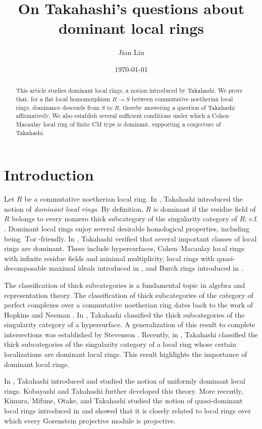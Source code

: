 \documentclass{amsart}
\author[Jian Liu]{Jian Liu}
\title[On Takahashi's questions about dominant local rings]{On Takahashi's questions about dominant local rings}
\date{\today}
\newcommand{\0}{{\bf{0}}}
\DeclareMathOperator{\Tor}{Tor}
\theoremstyle{definition}
\begin{document}
\begin{abstract}
This article studies dominant local rings, a notion introduced by Takahashi. We prove that, for a flat local homomorphism $R \longrightarrow S$ between commutative noetherian local rings, dominance descends from $S$ to $R$, thereby answering a question of Takahashi affirmatively. We also establish several sufficient conditions under which a Cohen--Macaulay local ring of finite CM type is dominant, supporting a conjecture of Takahashi.
\end{abstract}
\maketitle

\section{Introduction}

Let $R$ be a commutative noetherian local ring. In \cite{Takahashi:2023}, Takahashi introduced the notion of \emph{dominant local rings}. By definition, $R$ is dominant if the residue field of $R$ belongs to every nonzero thick subcategory of the singularity category of $R$; c.f. . Dominant local rings enjoy several desirable homological properties, including being $\Tor$-friendly.  In \cite{Takahashi:2023}, Takahashi verified that several important classes of local rings are dominant. These include hypersurfaces, Cohen--Macaulay local rings with infinite residue fields and minimal multiplicity, local rings with quasi-decomposable maximal ideals introduced in \cite{NT}, and Burch rings introduced in \cite{DKT2020}. 

The classification of thick subcategories is a fundamental topic in algebra and representation theory. The classification of thick subcategories of the category of perfect complexes over a commutative noetherian ring dates back to the work of Hopkins \cite{Hopkins} and Neeman \cite{Neeman92-DR}. In \cite{Takahashi:2010}, Takahashi classified the thick subcategories of the singularity category of a hypersurface. A generalization of this result to complete intersections was established by Stevenson \cite{Stevenson}.  Recently, in \cite{Takahashi:2023}, Takahashi classified the thick subcategories of the singularity category of a local ring whose certain localizations are dominant local rings. This result highlights the importance of dominant local rings. 

In \cite{Takahashi:2026}, Takahashi introduced and studied the notion of uniformly dominant local rings. Kobayashi and Takahashi \cite{KT2026} further developed this theory. More recently, Kimura, Mifune, Otake, and Takahashi \cite{KMOT} studied the notion of quasi-dominant local rings introduced in \cite{Takahashi:2023} and showed that it is closely related to local rings over which every Gorenstein projective module is projective.
\end{document}
